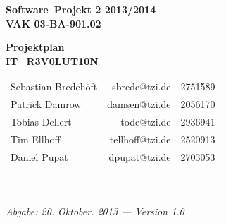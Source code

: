 \documentclass[fontsize=12pt,paper=a4,twoside]{scrartcl}
\begin{document}
  \thispagestyle{fancy}
  \fancyhead[LO,RE]{ }
  \fancyfoot[C]{}

  \vspace{3cm}

  \begin{minipage}[H]{\textwidth}
  \begin{center}
  \bf
  \Large
  Software--Projekt 2 2013/2014\\
  \smallskip
  \small
  VAK 03-BA-901.02\\
  \vspace{3cm}
  \end{center}
  \end{minipage}
  \begin{minipage}[H]{\textwidth}
  \begin{center}
  \vspace{1cm}
  \bf
  \Large Projektplan\\ 
  \vspace{3ex}
  \small IT\_R3V0LUT10N\\
  \vfill
  \end{center}
  \end{minipage}
  \vfill
  \begin{minipage}[H]{\textwidth}
  \begin{center}
  \sf
  \begin{tabular}{lrr}
  Sebastian Bredehöft & sbrede@tzi.de & 2751589\\
  Patrick Damrow & damsen@tzi.de & 2056170\\
  Tobias Dellert & tode@tzi.de & 2936941\\
  Tim Ellhoff & tellhoff@tzi.de & 2520913\\
  Daniel Pupat & dpupat@tzi.de & 2703053\\
  
  \end{tabular}
  \\ ~
  \vspace{2cm}
  \\
  \it Abgabe: 20. Oktober. 2013 --- Version 1.0\\ ~
  \end{center}
  \end{minipage}

\end{document}
